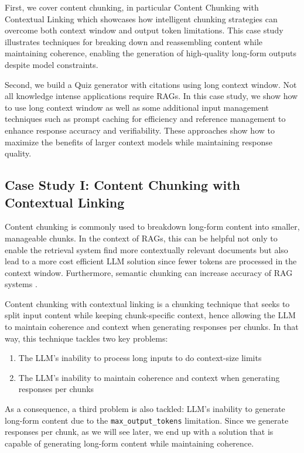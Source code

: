 First, we cover content chunking, in particular Content Chunking with Contextual Linking which showcases how intelligent chunking strategies can overcome both context window and output token limitations. This case study illustrates techniques for breaking down and reassembling content while maintaining coherence, enabling the generation of high-quality long-form outputs despite model constraints.

Second, we build a Quiz generator with citations using long context window. Not all knowledge intense applications require RAGs. In this case study, we show how to use long context window as well as some additional input management techniques such as prompt caching for efficiency and reference management to enhance response accuracy and verifiability. These approaches show how to maximize the benefits of larger context models while maintaining response quality.

\subsection{Case Study I: Content Chunking with Contextual Linking}
\label{chunking}
Content chunking is commonly used to breakdown long-form content into smaller, manageable chunks. In the context of RAGs, this can be helpful not only to enable the retrieval system find more contextually relevant documents but also lead to a more cost efficient LLM solution since fewer tokens are processed in the context window. Furthermore, semantic chunking can increase accuracy of RAG systems .

Content chunking with contextual linking is a chunking technique that seeks to split input content while keeping chunk-specific context, hence allowing the LLM to maintain coherence and context when generating responses per chunks. In that way, this technique tackles two key problems:
\begin{enumerate}
\item The LLM's inability to process long inputs to do context-size limits
\item The LLM's inability to maintain coherence and context when generating responses per chunks
\end{enumerate}

As a consequence, a third problem is also tackled: LLM's inability to generate long-form content due to the \texttt{max\_output\_tokens} limitation. Since we generate responses per chunk, as we will see later, we end up with a solution that is capable of generating long-form content while maintaining coherence.

